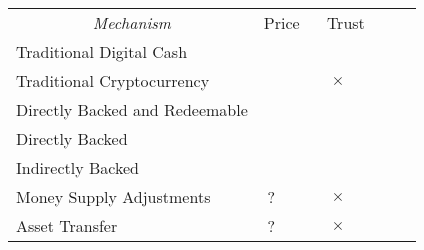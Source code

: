 
\begin{table}[t!]
\centering

	\begin{tabular}{ lllllllll}

&
\headrow{Corrects undervaluation} &
\headrow{Corrects overvaluation} &
\headrow{Decentralizes issuance } &
\headrow{Decentralizes redemption} &
\headrow{Decentralizes transfer} &
\headrow{No trusted oracle} \\
\hline

	 \multicolumn{1}{c}{\textit{Mechanism} } &    \multicolumn{2}{|c|}{Price} &  \multicolumn{4}{c}{Trust}  \\

	\hline

	Traditional Digital Cash			& \multicolumn{1}{|c|}{\full} & \multicolumn{1}{c|}{\full}   & \multicolumn{1}{c|}{} & \multicolumn{1}{c|}{} & \multicolumn{1}{c|}{} & \multicolumn{1}{c}{\full}   \\
	
	Traditional Cryptocurrency			& \multicolumn{1}{|c|}{} & \multicolumn{1}{c|}{}   & \multicolumn{1}{c|}{\full} & \multicolumn{1}{c|}{$\times$} & \multicolumn{1}{c|}{\full} & \multicolumn{1}{c}{\full}   \\

	\hline

	Directly Backed and Redeemable	& \multicolumn{1}{|c|}{\full} 	& \multicolumn{1}{c|}{\full}   & \multicolumn{1}{c|}{} 		& \multicolumn{1}{c|}{} 		& \multicolumn{1}{c|}{\full} & \multicolumn{1}{c}{\full}    \\
	Directly Backed                              	& \multicolumn{1}{|c|}{} 		& \multicolumn{1}{c|}{\full}   & \multicolumn{1}{c|}{ } 	& \multicolumn{1}{c|}{} 		& \multicolumn{1}{c|}{\full} & \multicolumn{1}{c}{\full}    \\
	Indirectly Backed 				& \multicolumn{1}{|c|}{\prt} 	& \multicolumn{1}{c|}{\full}   & \multicolumn{1}{c|}{\full} 	& \multicolumn{1}{c|}{\full} 	& \multicolumn{1}{c|}{\full} & \multicolumn{1}{c}{}    \\      
	Money Supply Adjustments             	& \multicolumn{1}{|c|}{?} 		& \multicolumn{1}{c|}{\prt}   & \multicolumn{1}{c|}{\full} 	& \multicolumn{1}{c|}{$\times$} 		& \multicolumn{1}{c|}{\full} & \multicolumn{1}{c}{}    \\
	Asset Transfer	                                & \multicolumn{1}{|c|}{?} 		& \multicolumn{1}{c|}{\prt}   & \multicolumn{1}{c|}{\full} 	& \multicolumn{1}{c|}{$\times$} 		& \multicolumn{1}{c|}{\full} & \multicolumn{1}{c}{}    \\
	\hline


\end{tabular}
\end{table}
